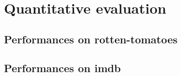 \section{Quantitative evaluation}\label{sec:quantitative-evaluation}

\subsection{Performances on rotten-tomatoes}\label{subsec:performances-rotten-tomatoes}


\subsection{Performances on imdb}\label{subsec:performances-imdb}

